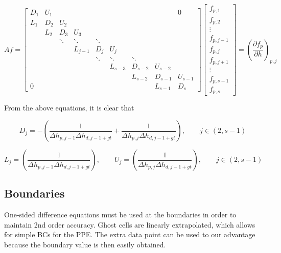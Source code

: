 \documentclass[11pt]{article}
\begin{document}
\[
Af = 
\left[
\begin{array}{ccccccccc}
D_{1} & U_{1} &  &   &   &   &   &   & 0 \\
L_{1} & D_{2} & U_{2} &   &   &   &   &   &   \\
  & L_{2} & D_{3} & U_{3} &   &   &   &   &   \\
  &   & \ddots & \ddots & \ddots &   &   &   &   \\
  &   &   & L_{j-1} & D_{j} & U_{j} &   &   &   \\
  &   &   &   & \ddots & \ddots & \ddots &   &   \\
  &   &   &   &   & L_{s-3} & D_{s-2} & U_{s-2} &   \\
  &   &   &   &   &   & L_{s-2} & D_{s-1} & U_{s-1} \\
0 &   &   &   &   &   &   & L_{s-1} & D_{s}
\end{array}
\right]
\left[ \begin{array}{c}
f_{p,1} \\ f_{p,2} \\ \vdots \\ f_{p,j-1} \\ f_{p,j} \\ f_{p,j+1} \\ \vdots \\ f_{p,s-1} \\ f_{p,s}
\end{array} \right]
 = \left( \frac{\partial f_{p}}{\partial h} \right)_{p,j}
\]

From the above equations, it is clear that

\begin{equation}
  D_j = -\left( \frac{1}{\Delta h_{p,j-1} \Delta h_{d,j-1+gt}} + \frac{1}{\Delta h_{p,j} \Delta h_{d,j-1+gt}} \right), \qquad j \in (2,s-1)
\end{equation}

\begin{equation}
  L_j = \left( \frac{1}{\Delta h_{p,j-1} \Delta h_{d,j-1+gt}} \right), \qquad
  U_j = \left( \frac{1}{\Delta h_{p,j} \Delta h_{d,j-1+gt}} \right), \qquad j \in (2,s-1)
\end{equation}

\subsection{Boundaries}
One-sided difference equations must be used at the boundaries in order to maintain 2nd order accuracy. Ghost cells are linearly extrapolated, which allows for simple BCs for the PPE. The extra data point can be used to our advantage because the boundary value is then easily obtained.
\end{document}
